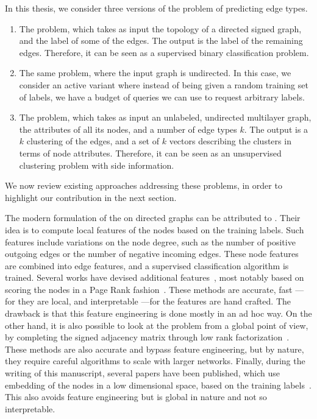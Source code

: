 In this thesis, we consider three versions of the problem of predicting edge types.
\begin{enumerate}

  \item The \esp{} problem, which takes as input the topology of a directed signed graph, and the
    label of some of the edges. The output is the label of the remaining edges. Therefore, it can be
    seen as a supervised binary classification problem.

  \item The same \esp{} problem, where the input graph is undirected. In this case, we consider an
    active variant where instead of being given a random training set of labels, we have a budget of
    queries we can use to request arbitrary labels.

  \item The \ecp{} problem, which takes as input an unlabeled, undirected multilayer graph, the
    attributes of all its nodes, and a number of edge types $k$. The output is a $k$ clustering of
    the edges, and a set of $k$ vectors describing the clusters in terms of node attributes.
    Therefore, it can be seen as an unsupervised clustering problem with side information.
\end{enumerate}

We now review existing approaches addressing these problems, in order to highlight our contribution
in the next section.

The modern formulation of the \esp{} on directed graphs can be attributed to
\textcite{Leskovec2010}. Their idea is to compute local features of the nodes based on the training
labels. Such features include variations on the node degree, such as the number of positive
outgoing edges or the number of negative incoming edges. These node features are combined into edge
features, and a supervised classification algorithm is trained. Several works have devised
additional features~\autocites{Bayesian15}{Yuan2017}, most notably based on scoring the nodes in a
Page Rank fashion~\autocites{traag2010exponential}{shahriari2014ranking}{wu2016troll}. These methods
are accurate, fast ---for they are local, and interpretable ---for the features are hand crafted.
The drawback is that this feature engineering is done mostly in an ad hoc way. On the other hand, it
is also possible to look at the problem from a global point of view, by completing the
signed adjacency matrix through low rank
factorization~\autocites{LowRankCompletion14}{OnlineCompletion17}. These methods are also accurate
and bypass feature engineering, but by nature, they require careful algorithms to scale with larger
networks. Finally, during the writing of this manuscript, several papers have been published, which
use embedding of the nodes in a low dimensional space, based on the training
labels~\autocites{SIGNet17}{SNE17}. This also avoids feature engineering but is global in nature and
not so interpretable.

